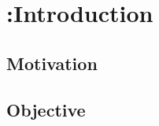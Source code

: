 \chapter[Introduction]{{\color{red} :}Introduction} \label{ch:intro}
%
\section{Motivation}\label{ch:motivation}


\section{Objective}









